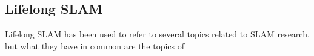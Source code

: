 \subsection{Lifelong SLAM}

Lifelong SLAM has been used to refer to several topics related to SLAM research, but what they have in common are the topics of